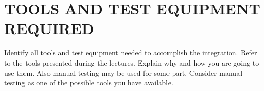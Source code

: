 \section{TOOLS AND TEST EQUIPMENT REQUIRED}
Identify all tools and test equipment needed to accomplish the integration. Refer to the tools presented during the lectures. Explain why and how you are going to use them. Also manual testing may be used for some part. Consider manual testing as one of the possible tools you have available.

